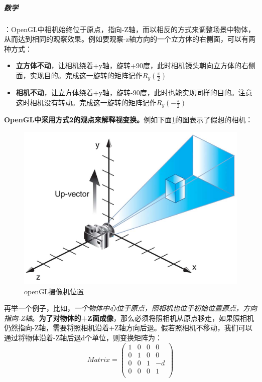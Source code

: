 \documentclass[UTF8,a4paper,12pt]{ctexbook}
\begin{document}
			\subparagraph{数学}：OpenGL中相机始终位于原点，指向-Z轴，而以相反的方式来调整场景中物体，从而达到相同的观察效果。例如要观察-z轴方向的一个立方体的右侧面，可以有两种方式：
				\begin{itemize}[itemindent = 1em]
					\item \textbf{立方体不动}，让相机绕着+y轴，旋转+90度，此时相机镜头朝向立方体的右侧面，实现目的。完成这一旋转的矩阵记作$R_y(\frac{\pi}{2})$
					\item \textbf{相机不动}，让立方体绕着+y轴，旋转-90度，此时也能实现同样的目的。注意这时相机没有转动。完成这一旋转的矩阵记作$R_y(-\frac{\pi}{2})$
				\end{itemize}
				
				\textbf{OpenGL中采用方式2的观点来解释视变换。}例如下面\ref{sxweizhi}的图表示了假想的相机：
				\begin{figure}[H]
					\centering
					\includegraphics[width=.8\linewidth]{Eye.png}
					\caption{openGL摄像机位置}
					\label{sxweizhi}
				\end{figure}	
				
				再举一个例子，比如，\textit{一个物体中心位于原点，照相机也位于初始位置原点，方向指向-Z轴}。\textbf{为了对物体的+Z面成像}，那么必须将照相机从原点移走，如果照相机仍然指向-Z轴，需要将照相机沿着+Z轴方向后退。假若照相机不移动，我们可以通过将物体沿着-Z轴后退d个单位，则变换矩阵为：
					$$
					Matrix = 
					\left(
					\begin{array}{cccc}
					1 & 0 & 0& 0\\
					
					0 & 1 & 0& 0\\
					
					0 & 0 & 1& -d\\
					
					0 & 0 & 0& 1\\
					\end{array}
					\right)
					$$
					
\end{document}
